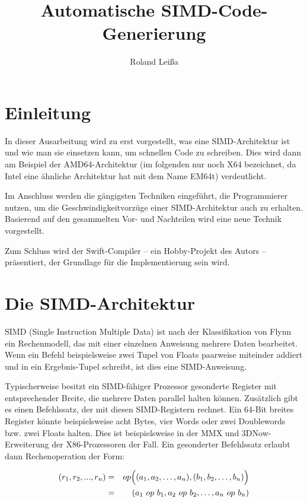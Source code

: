 \documentclass[a4paper,10pt]{article}
\title{Automatische SIMD-Code-Generierung}
\author{Roland Leißa}
\begin{document}
\maketitle

\section{Einleitung}

In dieser Ausarbeitung wird zu erst vorgestellt, was eine SIMD-Architektur ist und wie man sie
einsetzen kann, um schnellen Code zu schreiben. Dies wird dann am Beispiel der AMD64-Architektur (im
folgenden nur noch X64 bezeichnet, da Intel eine ähnliche Architektur hat mit dem Name EM64t)
verdeutlicht.

Im Anschluss werden die gängigsten Techniken eingeführt, die Programmierer nutzen, um die
Geschwindigkeitvorzüge einer SIMD-Architektur auch zu erhalten. Basierend auf den gesammelten
Vor- und Nachteilen wird eine neue Technik vorgestellt.

Zum Schluss wird der Swift-Compiler -- ein Hobby-Projekt des Autors -- präsentiert, der Grundlage
für die Implementierung sein wird.

\section{Die SIMD-Architektur}

SIMD (Single Instruction Multiple Data) ist nach der Klassifikation von Flynn ein Rechenmodell, das
mit einer einzelnen Anweisung mehrere Daten bearbeitet. Wenn ein Befehl beispielsweise zwei Tupel
von Floats paarweise miteinder addiert und in ein Ergebnis-Tupel schreibt, ist dies eine
SIMD-Anweisung.

Typischerweise besitzt ein SIMD-fähiger Prozessor gesonderte Register mit entsprechender Breite, die
mehrere Daten parallel halten können. Zusätzlich gibt es einen Befehlssatz, der mit diesen
SIMD-Registern rechnet. Ein 64-Bit breites Register könnte beispielsweise acht Bytes, vier Words
oder zwei Doublewords bzw. zwei Floats halten. Dies ist beispielsweise in der MMX und
3DNow-Erweiterung der X86-Prozessoren der Fall. Ein gesonderter Befehlssatz erlaubt dann
Rechenoperation der Form:

\begin{eqnarray*}
    (r_1, r_2, ..., r_n)    & = & op\Bigl( (a_1, a_2, \dots, a_n), (b_1, b_2, \dots, b_n) \Bigr)\\ 
                            & = & (a_1 \ op \ b_1, a_2 \ op \ b_2, \dots, a_n \ op \ b_n)
\end{eqnarray*}
\end{document}

